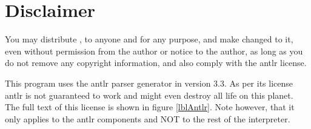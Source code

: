 %


\section{Disclaimer}
You may distribute \setlX{}, to anyone and for any purpose, and make changed to it, even without permission from the author or notice to the author, as long as you do not remove any copyright information, and also comply with the antlr license.

This program uses the antlr parser generator in version 3.3. As per its license antlr is not guaranteed to work and might even destroy all life on this planet. The full text of this license is shown in figure \ref{lblAntlr}. Note however, that it only applies to the antlr components and NOT to the rest of the interpreter.




